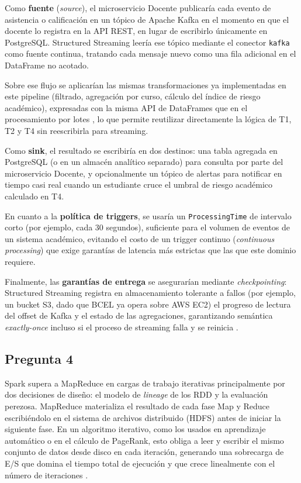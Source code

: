 \documentclass[11pt,a4paper]{article}
\begin{document}
Como \textbf{fuente} (\textit{source}), el microservicio Docente publicaría
cada evento de asistencia o calificación en un tópico de Apache Kafka en el
momento en que el docente lo registra en la API REST, en lugar de escribirlo
únicamente en PostgreSQL. Structured Streaming leería ese tópico mediante el
conector \texttt{kafka} como fuente continua, tratando cada mensaje nuevo como
una fila adicional en el DataFrame no acotado.

Sobre ese flujo se aplicarían las mismas transformaciones ya implementadas en
este pipeline (filtrado, agregación por curso, cálculo del índice de riesgo
académico), expresadas con la misma API de DataFrames que en el procesamiento
por lotes \cite{armbrust2015}, lo que permite reutilizar directamente la
lógica de T1, T2 y T4 sin reescribirla para streaming.

Como \textbf{sink}, el resultado se escribiría en dos destinos: una tabla
agregada en PostgreSQL (o en un almacén analítico separado) para consulta por
parte del microservicio Docente, y opcionalmente un tópico de alertas para
notificar en tiempo casi real cuando un estudiante cruce el umbral de riesgo
académico calculado en T4.

En cuanto a la \textbf{política de triggers}, se usaría un
\texttt{ProcessingTime} de intervalo corto (por ejemplo, cada 30 segundos),
suficiente para el volumen de eventos de un sistema académico, evitando el
costo de un trigger continuo (\textit{continuous processing}) que exige
garantías de latencia más estrictas que las que este dominio requiere.

Finalmente, las \textbf{garantías de entrega} se asegurarían mediante
\textit{checkpointing}: Structured Streaming registra en almacenamiento
tolerante a fallos (por ejemplo, un bucket S3, dado que BCEL ya opera sobre
AWS EC2) el progreso de lectura del offset de Kafka y el estado de las
agregaciones, garantizando semántica \textit{exactly-once} incluso si el
proceso de streaming falla y se reinicia \cite{zaharia2016}.

\subsection*{Pregunta 4}

Spark supera a MapReduce en cargas de trabajo iterativas principalmente por
dos decisiones de diseño: el modelo de \textit{lineage} de los RDD y la
evaluación perezosa. MapReduce materializa el resultado de cada fase Map y
Reduce escribiéndolo en el sistema de archivos distribuido (HDFS) antes de
iniciar la siguiente fase. En un algoritmo iterativo, como los usados en
aprendizaje automático o en el cálculo de PageRank, esto obliga a leer y
escribir el mismo conjunto de datos desde disco en cada iteración, generando
una sobrecarga de E/S que domina el tiempo total de ejecución y que crece
linealmente con el número de iteraciones \cite{zaharia2012}.
\end{document}
